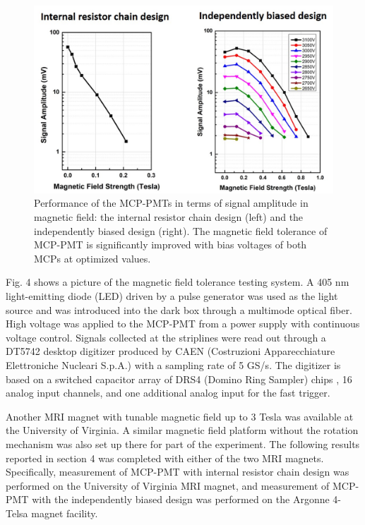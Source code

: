 ﻿\documentclass[preprint,5p]{elsarticle}
\begin{document}
\begin{figure}[tbp]
\centering \includegraphics[scale=0.7]{fig/Figure5.jpg}
\caption{Performance of the MCP-PMTs in terms of signal amplitude in magnetic 
   field: the internal resistor chain design (left) and the independently 
   biased design (right). The magnetic field tolerance of MCP-PMT is 
   significantly improved with bias voltages of both MCPs at optimized values.  
   } \label{fig:design}
\end{figure}



Fig. 4 shows a picture of the magnetic field tolerance testing system. A 405 nm 
light-emitting diode (LED) driven by a pulse generator was used as the light 
source and was introduced into the dark box through a multimode optical 
fiber. High voltage was applied to the MCP-PMT from a power supply with 
continuous voltage control. Signals collected at the striplines were read out 
through a DT5742 desktop digitizer \cite{19} produced by CAEN (Costruzioni 
Apparecchiature Elettroniche Nucleari S.p.A.) with a sampling rate of 5 GS/s.  
The digitizer is based on a switched capacitor array of DRS4 (Domino Ring 
Sampler) chips \cite{20}, 16 analog input channels, and one additional analog 
input for the fast trigger. 

Another MRI magnet with tunable magnetic field up to 3 Tesla was available at 
the University of Virginia. A similar magnetic field platform without the 
rotation mechanism was also set up there for part of the experiment. The 
following results reported in section 4 was completed with either of the two 
MRI magnets. Specifically, measurement of MCP-PMT with internal resistor chain 
design was performed on the University of Virginia MRI magnet, and measurement 
of MCP-PMT with the independently biased design was performed on the Argonne 
4-Telsa magnet facility. 
\end{document}
